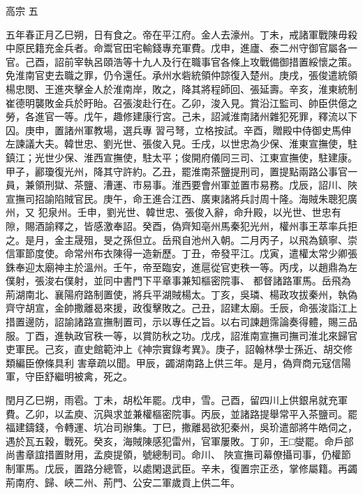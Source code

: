 
\begin{pinyinscope}

 高宗
 五



 五年春正月乙巳朔，日有食之。帝在平江府。金人去濠州。丁未，戒諸軍戰陳毋殺中原民籍充金兵者。命鬻官田宅輸錢專充軍費。戊申，進廬、泰二州守御官屬各一
 官。己酉，詔前宰執呂頤浩等十九人及行在職事官各條上攻戰備御措置綏懷之策。免淮南官吏去職之罪，仍令還任。承州水砦統領仲諒復入楚州。庚戌，張俊遣統領楊忠閔、王進夾擊金人於淮南岸，敗之，降其將程師回、張延壽。辛亥，淮東統制崔德明襲敗金兵於盱眙。召張浚赴行在。乙卯，浚入見。賞沿江監司、帥臣供億之勞，各進官一等。戊午，趣修建康行宮。己未，詔減淮南諸州雜犯死罪，釋流以下囚。庚申，置諸州軍教場，選兵專
 習弓弩，立格按試。辛酉，贈殿中侍御史馬伸左諫議大夫。韓世忠、劉光世、張俊入見。壬戌，以世忠為少保、淮東宣撫使，駐鎮江；光世少保、淮西宣撫使，駐太平；俊開府儀同三司、江東宣撫使，駐建康。甲子，酈瓊復光州，降其守許約。乙丑，罷淮南茶鹽提刑司，置提點兩路公事官一員，兼領刑獄、茶鹽、漕運、市易事。淮西要會州軍並置市易務。戊辰，詔川、陜宣撫司招諭陷賊官民。庚午，命王進合江西、廣東諸將兵討周十隆。海賊朱聰犯廣州，又
 犯泉州。壬申，劉光世、韓世忠、張俊入辭，命升殿，以光世、世忠有隙，賜酒諭釋之，皆感激奉詔。癸酉，偽齊知亳州馬秦犯光州，權州事王萃率兵拒之。是月，金主晟殂，旻之孫但立。岳飛自池州入朝。二月丙子，以飛為鎮寧、崇信軍節度使。命常州布衣陳得一造新歷。丁丑，帝發平江。戊寅，遣權太常少卿張銖奉迎太廟神主於溫州。壬午，帝至臨安，進扈從官吏秩一等。丙戌，以趙鼎為左僕射，張浚右僕射，並同中書門下平章事兼知樞密院事、
 都督諸路軍馬。岳飛為荊湖南北、襄陽府路制置使，將兵平湖賊楊太。丁亥，吳璘、楊政攻拔秦州，執偽齊守胡宣，金帥撒離曷來援，政復擊敗之。己丑，詔建太廟。壬辰，命張浚詣江上措置邊防，詔諭諸路宣撫制置司，示以專任之旨。以右司諫趙霈論奏得體，賜三品服。丁酉，進執政官秩一等，以賞防秋之功。戊戌，詔淮南宣撫司撫司淮北來歸官吏軍民。己亥，直史館範沖上《神宗實錄考異》。庚子，詔翰林學士孫近、胡交修類編臣僚條具利
 害章疏以聞。甲辰，蠲湖南路上供三年。是月，偽齊商元寇信陽軍，守臣舒繼明被禽，死之。



 閏月乙巳朔，雨雹。丁未，胡松年罷。戊申，雪。己酉，留四川上供銀帛就充軍費。乙卯，以孟庾、沉與求並兼權樞密院事。丙辰，並諸路提舉常平入茶鹽司。罷福建鑄錢，令轉運、坑冶司辦集。丁巳，撒離曷欲犯秦州，吳玠遣部將牛皓伺之，遇於瓦五穀，戰死。癸亥，海賊陳感犯雷州，官軍屢敗。丁卯，王□燮罷。命戶部尚書章誼措置財用，孟庾提領，號總制司。命川、
 陜宣撫司幕僚攝司事，仍權節制軍馬。戊辰，置路分總管，以處閑退武臣。辛未，復置宗正丞，掌修屬籍。再蠲荊南府、歸、峽二州、荊門、公安二軍歲貢上供二年。




\end{pinyinscope}
